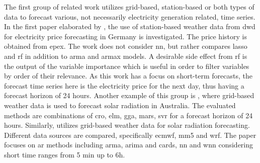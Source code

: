 The first group of related work utilizes grid-based, station-based or both types of data to forecast various, not necessarily electricity generation related, time series. In the first paper elaborated by , the use of station-based weather data from \gls{dwd} for electricity price forecasting in Germany is investigated. The price history is obtained from \gls{epex}. The work does not consider \gls{nn}, but rather compares \gls{lasso} and \gls{rf} in addition to \gls{arma} and \gls{armax} models. A desirable side effect from \gls{rf} is the output of the variable importance which is useful in order to filter variables by order of their relevance. As this work has a focus on short-term forecasts, the forecast time series here is the electricity price for the next day, thus having a forecast horizon of 24 hours. Another example of this group is , where grid-based weather data is used to forecast solar radiation in Australia. The evaluated methods are combinations of \gls{cro}, \gls{elm}, \gls{gga}, \gls{mars}, \gls{svr} for a forecast horizon of 24 hours. Similarly,  utilizes grid-based weather data for solar radiation forecasting. Different data sources are compared, specifically \gls{ecmwf}, \gls{mm5} and \gls{wrf}. The paper focuses on \gls{ar} methods including \gls{arma}, \gls{arima} and \gls{cards}, \gls{nn} and \gls{wnn} considering short time ranges from 5 min up to 6h.\\

